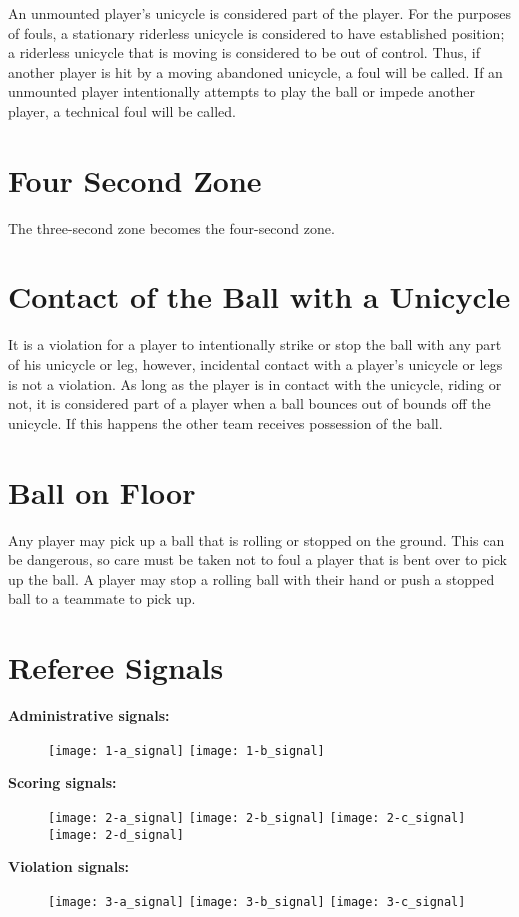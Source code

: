 An unmounted player's unicycle is considered part of the player.
For the purposes of fouls, a stationary riderless unicycle is considered to have established position; a riderless unicycle that is moving is considered to be out of control.
Thus, if another player is hit by a moving abandoned unicycle, a foul will be called.
If an unmounted player intentionally attempts to play the ball or impede another player, a technical foul will be called.

\section{Four Second Zone}
The three-second zone becomes the four-second zone.

\section{Contact of the Ball with a Unicycle}
It is a violation for a player to intentionally strike or stop the ball with any part of his unicycle or leg, however, incidental contact with a player's unicycle or legs is not a violation.
As long as the player is in contact with the unicycle, riding or not, it is considered part of a player when a ball bounces out of bounds off the unicycle.
If this happens the other team receives possession of the ball.

\section{Ball on Floor}
Any player may pick up a ball that is rolling or stopped on the ground.
This can be dangerous, so care must be taken not to foul a player that is bent over to pick up the ball.
A player may stop a rolling ball with their hand or push a stopped ball to a teammate to pick up.

\newpage

\section{Referee Signals}

\textbf{Administrative signals:}

\begin{figure}[h]
\texttt{[image: 1-a\_signal]}
\texttt{[image: 1-b\_signal]}
\end{figure}

\textbf{Scoring signals:}
\begin{figure}[h]
\texttt{[image: 2-a\_signal]}
\texttt{[image: 2-b\_signal]}
\texttt{[image: 2-c\_signal]}
\texttt{[image: 2-d\_signal]}
\end{figure}

\textbf{Violation signals:}

\begin{figure}[h]
\texttt{[image: 3-a\_signal]}
\texttt{[image: 3-b\_signal]}
\texttt{[image: 3-c\_signal]}

\end{figure}
